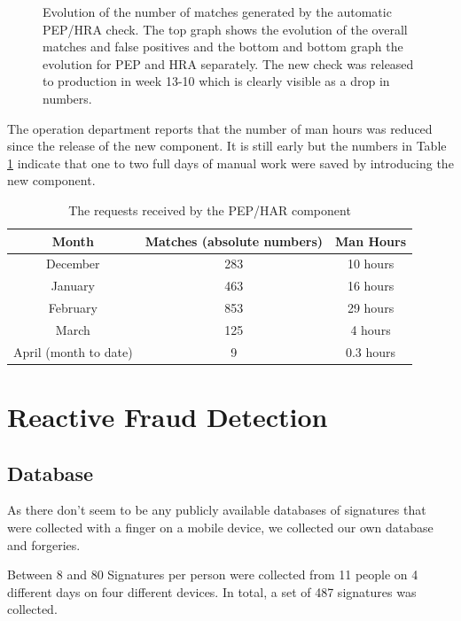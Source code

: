 \documentclass[a4paper, oneside]{csthesis}
\begin{document}
\begin{figure}
        \caption{Evolution of the number of matches generated by the automatic PEP/HRA check. The top graph shows the evolution of the overall matches and false positives and the bottom and bottom graph the evolution for PEP and HRA separately. The new check was released to production in week 13-10 which is clearly visible as a drop in numbers.}
        \label{fig:pep-hra-charts}
\end{figure}

The operation department reports that the number of man hours was reduced since the release of the new component. It is still early but the numbers in Table \ref{tbl:man-hours} indicate that one to two full days of manual work were saved by introducing the new component.

\begin{table}[tb]
    \begin{center}
        \begin{tabular}{c|c|c}Month & Matches (absolute numbers) & Man Hours \\ \hline
        December & 283 & 10 hours \\ \hdashline[0.5pt/3pt]
        January & 463 & 16 hours  \\ \hdashline[0.5pt/3pt]
        February & 853 & 29 hours \\ \hline \hline
        March & 125 & 4 hours \\ \hdashline[0.5pt/3pt]
        April (month to date) & 9 & 0.3 hours \\ \hline
        \end{tabular}
    \end{center}
    \label{tbl:man-hours}
    \caption{The requests received by the PEP/HAR component}
\end{table}



\section{Reactive Fraud Detection}
\label{sec:exp-reactive}

\subsection{Database}

As there don't seem to be any publicly available databases of signatures that were collected with a finger on a mobile device, we collected our own database and forgeries.

Between 8 and 80 Signatures per person were collected from 11 people on 4 different days on four different devices. In total, a set of 487 signatures was collected.
\end{document}
